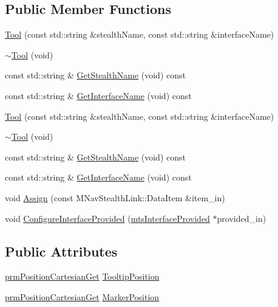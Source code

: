 \subsection*{Public Member Functions}
\begin{DoxyCompactItemize}
\item 
\hyperlink{classmts_medtronic_stealthlink_1_1_tool_a5dcdf7314253cf8a4c34894320a995d5}{Tool} (const std\-::string \&stealth\-Name, const std\-::string \&interface\-Name)
\item 
\hyperlink{classmts_medtronic_stealthlink_1_1_tool_ac161860a5f800b2442e224cbe05d1a9d}{$\sim$\-Tool} (void)
\item 
const std\-::string \& \hyperlink{classmts_medtronic_stealthlink_1_1_tool_a94202828748d5ec14f3bac3986fedf9d}{Get\-Stealth\-Name} (void) const 
\item 
const std\-::string \& \hyperlink{classmts_medtronic_stealthlink_1_1_tool_a715888355806a4f9c0a369cf28175a46}{Get\-Interface\-Name} (void) const 
\item 
\hyperlink{classmts_medtronic_stealthlink_1_1_tool_a5dcdf7314253cf8a4c34894320a995d5}{Tool} (const std\-::string \&stealth\-Name, const std\-::string \&interface\-Name)
\item 
\hyperlink{classmts_medtronic_stealthlink_1_1_tool_ac161860a5f800b2442e224cbe05d1a9d}{$\sim$\-Tool} (void)
\item 
const std\-::string \& \hyperlink{classmts_medtronic_stealthlink_1_1_tool_a94202828748d5ec14f3bac3986fedf9d}{Get\-Stealth\-Name} (void) const 
\item 
const std\-::string \& \hyperlink{classmts_medtronic_stealthlink_1_1_tool_a715888355806a4f9c0a369cf28175a46}{Get\-Interface\-Name} (void) const 
\item 
void \hyperlink{classmts_medtronic_stealthlink_1_1_tool_a2a147aab96afb4ccdb351cc9756e96ff}{Assign} (const M\-Nav\-Stealth\-Link\-::\-Data\-Item \&item\-\_\-in)
\item 
void \hyperlink{classmts_medtronic_stealthlink_1_1_tool_a30c49ba6f30cd8b0528969d2d5faacdc}{Configure\-Interface\-Provided} (\hyperlink{classmts_interface_provided}{mts\-Interface\-Provided} $\ast$provided\-\_\-in)
\end{DoxyCompactItemize}
\subsection*{Public Attributes}
\begin{DoxyCompactItemize}
\item 
\hyperlink{classprm_position_cartesian_get}{prm\-Position\-Cartesian\-Get} \hyperlink{classmts_medtronic_stealthlink_1_1_tool_acf9d37a43587bf06a4b596d77feabd9f}{Tooltip\-Position}
\item 
\hyperlink{classprm_position_cartesian_get}{prm\-Position\-Cartesian\-Get} \hyperlink{classmts_medtronic_stealthlink_1_1_tool_ac1e88de569626cdb66f345ebeffc6228}{Marker\-Position}
\end{DoxyCompactItemize}
